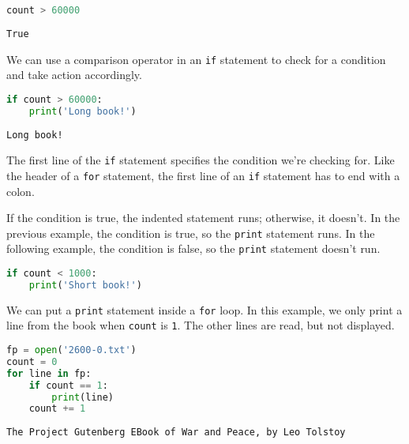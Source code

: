\begin{lstlisting}[language=Python,style=source]
count > 60000
\end{lstlisting}

\begin{lstlisting}[style=output]
True
\end{lstlisting}

We can use a comparison operator in an \passthrough{\lstinline!if!}
statement to check for a condition and take action accordingly.

\begin{lstlisting}[language=Python,style=source]
if count > 60000:
    print('Long book!')
\end{lstlisting}

\begin{lstlisting}[style=output]
Long book!
\end{lstlisting}

The first line of the \passthrough{\lstinline!if!} statement specifies
the condition we're checking for. Like the header of a
\passthrough{\lstinline!for!} statement, the first line of an
\passthrough{\lstinline!if!} statement has to end with a colon.

If the condition is true, the indented statement runs; otherwise, it
doesn't. In the previous example, the condition is true, so the
\passthrough{\lstinline!print!} statement runs. In the following
example, the condition is false, so the \passthrough{\lstinline!print!}
statement doesn't run.

\begin{lstlisting}[language=Python,style=source]
if count < 1000:
    print('Short book!')
\end{lstlisting}

We can put a \passthrough{\lstinline!print!} statement inside a
\passthrough{\lstinline!for!} loop. In this example, we only print a
line from the book when \passthrough{\lstinline!count!} is
\passthrough{\lstinline!1!}. The other lines are read, but not
displayed.

\begin{lstlisting}[language=Python,style=source]
fp = open('2600-0.txt')
count = 0
for line in fp:
    if count == 1:
        print(line)
    count += 1
\end{lstlisting}

\begin{lstlisting}[style=output]
The Project Gutenberg EBook of War and Peace, by Leo Tolstoy
\end{lstlisting}

